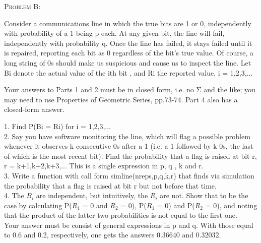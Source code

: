 \documentclass[12pt]{article}
\newenvironment{statement}[1]
{\begin{mdframed}[linewidth=0.6pt]
        \textsc{ #1:}

}
    {\end{mdframed}}
\begin{document}
\newpage
\begin{statement}{Problem B}
Consider a communications line in which the true bits are 1 or 0, independently with probability of a 1 being p each. At any given bit, the line will fail, independently with probability q. Once the line has failed, it stays failed until it is repaired, reporting each bit as 0 regardless of the bit's true value. Of course, a long string of 0s should make us suspicious and cause us to inspect the line. Let Bi denote the actual value of the ith bit , and Ri the reported value, i = 1,2,3,...

Your answers to Parts 1 and 2 must be in closed form, i.e. no Σ and the like; you may need to use Properties of Geometric Series, pp.73-74. Part 4 also has a closed-form answer.

1. Find P(Bi = Ri) for i = 1,2,3,...\\

2. Say you have software monitoring the line, which will flag a possible problem whenever it observes k consecutive 0s after a 1 (i.e. a 1 followed by k 0s, the last of which is the most recent bit). Find the probability that a flag is raised at bit r, r = k+1,k+2,k+3,... This is a single expression in p, q , k and r.\\

3. Write a function with call form
simline(nreps,p,q,k,r)
that finds via simulation the probability that a flag is raised at bit r but not before that time.\\

4. The $B_i$ are independent, but intuitively, the $R_i$ are not. Show that to be the case by calculating P($R_1$ = 0 and $R_2$ = 0), P($R_1$ = 0) and P($R_2$ = 0), and noting that the product of the latter two probabilities is not equal to the first one.\\
Your answer must be consist of general expressions in p and q. With those equal to 0.6 and 0.2, respectively, one gets the answers 0.36640 and 0.32032.

\end{statement}
\end{document}
